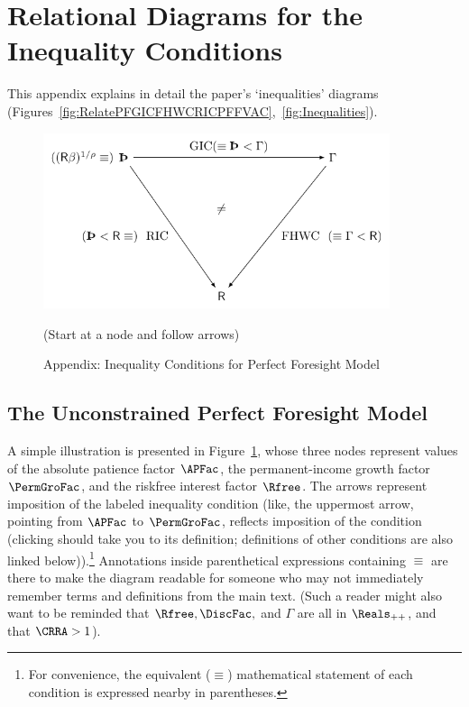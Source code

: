 \documentclass[\econtexRoot/BufferStockTheory]{subfiles}
\begin{document}
\hypertarget{ApndxConditionDiagrams}{}

\section{Relational Diagrams for the Inequality Conditions}\label{sec:ApndxConditionDiagrams}

This appendix explains in detail the paper's `inequalities' diagrams (Figures~\ref{fig:RelatePFGICFHWCRICPFFVAC},~\ref{fig:Inequalities}).

\hypertarget{InequalityPFGICFHWCRIC}{}
\begin{figure}
\centering
\includegraphics[width=4in]{Figures/InequalityPFGICFHWCRIC}
\caption{Appendix: Inequality Conditions for Perfect Foresight Model}
\centerline{ (Start at a node and follow arrows)}\label{fig:InequalityPFGICFHWCRIC}
\end{figure}

\subsection{The Unconstrained Perfect Foresight Model}

A simple illustration is presented in Figure~\ref{fig:InequalityPFGICFHWCRIC}, whose three nodes represent values of the absolute patience factor $\APFac$, the permanent-income growth factor $\PermGroFac$, and the riskfree interest factor $\Rfree$.
The arrows represent imposition of the labeled inequality condition  (like,  the uppermost arrow, pointing from {$\APFac$} to $\PermGroFac$, reflects imposition of the {\GICRaw} condition (clicking {\GICRaw} should take you to its definition; definitions of other conditions are also linked below)).\footnote{For convenience, the equivalent ($\equiv$) mathematical statement of each condition is expressed nearby in parentheses.}
Annotations inside parenthetical expressions containing $\equiv$ are there to make the diagram readable for someone who may not immediately remember terms and definitions from the main text.
(Such a reader might also want to be reminded that $\Rfree, \DiscFac, $ and $\Gamma$ are all in $\Reals_{++}$, and that $\CRRA>1$).
\end{document}

